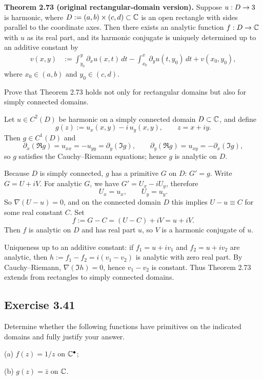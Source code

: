 \documentclass{article}
\begin{document}
\textbf{Theorem 2.73 (original rectangular-domain version).}
Suppose $u:D\to3$ is harmonic, where
$D:=(a,b)\times(c,d)\subset\mathbb{C}$ is an open rectangle with sides
parallel to the coordinate axes. Then there exists an analytic
function $f:D\to\mathbb{C}$ with $u$ as its real part, and its harmonic
conjugate is uniquely determined up to an additive constant by
\[
\begin{aligned}
v(x,y)
&:=\int_{y_0}^{y}\partial_xu(x,t)\,dt
-\int_{x_0}^{x}\partial_yu(t,y_0)\,dt
+v(x_0,y_0),
\end{aligned}
\]
where $x_0\in(a,b)$ and $y_0\in(c,d)$.

Prove that Theorem 2.73 holds not only for rectangular
domains but also for simply connected domains.

\begin{solution}
	Let $u\in C^2(D)$ be harmonic on a simply connected domain
	$D\subset\mathbb{C}$, and define
	\[
		g(z):=u_x(x,y)-i\,u_y(x,y),\qquad z=x+iy.
	\]
	Then $g\in C^1(D)$ and
	\[
		\partial_x(\Re g)=u_{xx}=-u_{yy}=\partial_y(\Im g),
		\qquad
		\partial_y(\Re g)=u_{xy}=-\partial_x(\Im g),
	\]
	so $g$ satisfies the Cauchy--Riemann equations; hence $g$ is
	analytic on $D$.

	Because $D$ is simply connected, $g$ has a primitive $G$ on $D$:
	$G'=g$.  Write $G=U+iV$.  For analytic $G$, we have
	$G'=U_x-iU_y$, therefore
	\[
		U_x=u_x,\qquad U_y=u_y.
	\]
	So $\nabla(U-u)=0$, and on the connected domain $D$ this implies
	$U-u\equiv C$ for some real constant $C$.
	Set
	\[
		f:=G-C=(U-C)+iV=u+iV.
	\]
	Then $f$ is analytic on $D$ and has real part $u$, so $V$ is a
	harmonic conjugate of $u$.

	Uniqueness up to an additive constant: if
	$f_1=u+iv_1$ and $f_2=u+iv_2$ are analytic, then
	$h:=f_1-f_2=i(v_1-v_2)$ is analytic with zero real part.
	By Cauchy--Riemann, $\nabla(\Im h)=0$, hence $v_1-v_2$ is constant.
	Thus Theorem 2.73 extends from rectangles to simply connected
	domains.\qedhere
\end{solution}

\subsection{Exercise 3.41}

Determine whether the following functions have primitives on
the indicated domains and fully justify your answer.

(a) $f(z)=1/z$ on $\mathbb{C}^\bullet$;

(b) $g(z)=\bar{z}$ on $\mathbb{C}$.
\end{document}
